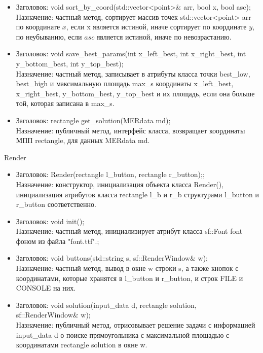 \documentclass[a4paper,12pt]{article}
\begin{document}
{{\begin{itemize}
\item Заголовок: void sort\_by\_coord(std::vector<point>\& arr, bool x, bool asc); \\
Назначение: частный метод, сортирует массив точек std::vector<point> arr по координате $x$, если x является истиной, иначе сортирует по координате $y$, по неубыванию, если $asc$ является истиной, иначе по невозрастанию.
\item Заголовок: void save\_best\_params(int x\_left\_best, int x\_right\_best, int y\_bottom\_best, int y\_top\_best);\\
Назначение: частный метод, записывает в атрибуты класса точки best\_low, best\_high и максимальную площадь max\_s координаты x\_left\_best, x\_right\_best, y\_bottom\_best, y\_top\_best и их площадь, если она больше той, которая записана в max\_s.
\item Заголовок: rectangle get\_solution(MERdata md);\\
Назначение: публичный метод, интерфейс класса, возвращает координаты МПП rectangle, для данных MERdata md.
\end{itemize}

\begin{center}
Render
\end{center}
\begin{itemize}
\item Заголовок: Render(rectangle l\_button, rectangle r\_button);; \\
Назначение: конструктор, инициализация объекта класса Render(), инициализация атрибутов класса rectangle l\_b и r\_b  структурами l\_button и r\_button соответственно.
\item Заголовок: void init();\\
Назначение: частный метод, инициализирует атрибут класса sf::Font font фоном из файла "font.ttf".;
\item Заголовок: void buttons(std::string s, sf::RenderWindow\& w);\\
Назначение: частный метод, вывод в окне w строки s, а также кнопок с координатами, которые хранятся в l\_button и r\_button, и строк FILE и CONSOLE на них. 
\item Заголовок: void solution(input\_data d, rectangle solution, sf::RenderWindow\& w); \\
Назначение: публичный метод, отрисовывает решение задачи с информацией input\_data d о поиске прямоугольника с максимальной площадью с координатами rectangle solution в окне w.
\end{itemize}

}}
\end{document}
